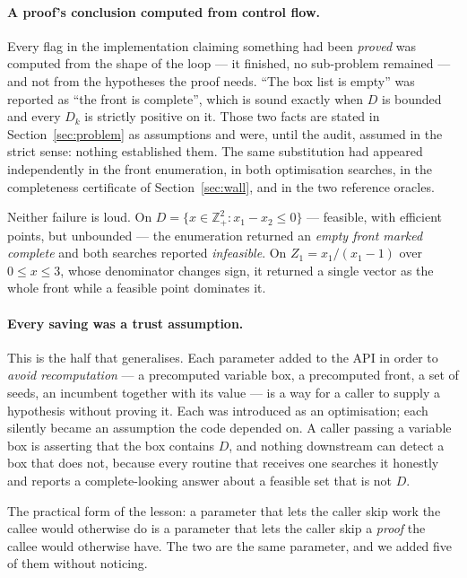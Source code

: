 \documentclass[11pt,a4paper]{article}
\newcommand{\Z}{Z}
\newcommand{\Dset}{D}
\newcommand{\Zint}{\mathbb{Z}}
\begin{document}
\paragraph{A proof's conclusion computed from control flow.}
Every flag in the implementation claiming something had been \emph{proved} was
computed from the shape of the loop --- it finished, no sub-problem remained
--- and not from the hypotheses the proof needs. ``The box list is empty'' was
reported as ``the front is complete'', which is sound exactly when $\Dset$ is
bounded and every $D_k$ is strictly positive on it. Those two facts are stated
in Section~\ref{sec:problem} as assumptions and were, until the audit, assumed
in the strict sense: nothing established them. The same substitution had
appeared independently in the front enumeration, in both optimisation
searches, in the completeness certificate of
Section~\ref{sec:wall}, and in the two reference oracles.

Neither failure is loud. On $\Dset = \{x \in \Zint^2_+ : x_1 - x_2 \leqslant
0\}$ --- feasible, with efficient points, but unbounded --- the enumeration
returned an \emph{empty front marked complete} and both searches reported
\emph{infeasible}. On $\Z_1 = x_1/(x_1 - 1)$ over $0 \leqslant x \leqslant 3$,
whose denominator changes sign, it returned a single vector as the whole front
while a feasible point dominates it.

\paragraph{Every saving was a trust assumption.}
This is the half that generalises. Each parameter added to the API in order to
\emph{avoid recomputation} --- a precomputed variable box, a precomputed front,
a set of seeds, an incumbent together with its value --- is a way for a caller
to supply a hypothesis without proving it. Each was introduced as an
optimisation; each silently became an assumption the code depended on. A caller
passing a variable box is asserting that the box contains $\Dset$, and nothing
downstream can detect a box that does not, because every routine that receives
one searches it honestly and reports a complete-looking answer about a feasible
set that is not $\Dset$.

The practical form of the lesson: a parameter that lets the caller skip work
the callee would otherwise do is a parameter that lets the caller skip a
\emph{proof} the callee would otherwise have. The two are the same parameter,
and we added five of them without noticing.
\end{document}
